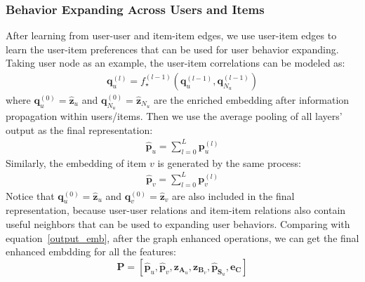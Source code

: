 
\subsubsection{Behavior Expanding Across Users and Items}
After learning from user-user and item-item edges, 
we use user-item edges to learn the user-item preferences that can be used for user behavior expanding.
Taking user node as an example, the user-item correlations can be modeled as: 
\begin{align}
\textbf{q}_u^{(l)} = f_{\star}^{(l-1)}(\textbf{q}_u^{(l-1)}, \textbf{q}_{N_u}^{(l-1)})
\end{align}
where $\textbf{q}_u^{(0)} = \hat{\textbf{z}}_u$ and $\textbf{q}_{N_u}^{(0)} = \hat{\textbf{z}}_{N_u}$ are the enriched embedding after information propagation within users/items.
Then we use the average pooling of all layers' output as the final representation:
\begin{align}
\hat{\textbf{p}}_u = \sum_{l=0}^{L}\textbf{p}_u^{(l)}
\end{align}
Similarly, the embedding of item $v$ is generated by the same process:
\begin{align}
\hat{\textbf{p}}_v = \sum_{l=0}^{L}\textbf{p}_v^{(l)}
\end{align}
Notice that $\textbf{q}_u^{(0)} = \hat{\textbf{z}}_u$ and $\textbf{q}_v^{(0)} = \hat{\textbf{z}}_v$ are also included in the final representation, because user-user relations and item-item relations also contain useful neighbors that can be used to expanding user behaviors.
Comparing with equation~\ref{output_emb}, after the graph enhanced operations,  we can get the final enhanced embdding for all the features:
\begin{equation}
 \textbf{P} = [\hat{\textbf{p}}_u, \hat{\textbf{p}}_v, \textbf{z}_{\textbf{A}_u}, \textbf{z}_{\textbf{B}_v}, \hat{\textbf{p}}_{\textbf{S}_u},
 \textbf{e}_{\textbf{C}}]
 \end{equation}

